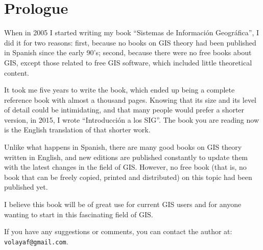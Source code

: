 \chapter*{Prologue}


When in 2005 I started writing my book ``Sistemas de Informaci\'{o}n Geogr\'{a}fica'', I did it for two reasons: first, because no books on GIS theory had been published in Spanish since the early 90's; second, because there were no free books about GIS, except those related to free GIS software, which included little theoretical content.

It took me five years to write the book, which ended up being a complete reference book with almost a thousand pages. Knowing that its size and its level of detail could be intimidating, and that many people would prefer a shorter version, in 2015, I wrote ``Introducci\'{o}n a los SIG''. The book you are reading now is the English translation of that shorter work.

Unlike what happens in Spanish, there are many good books on GIS theory written in English, and new editions are published constantly to update them with the latest changes in the field of GIS. However, no free book (that is, no book that can be freely copied, printed and distributed) on this topic had been published yet. 

I believe this book will be of great use for current GIS users and for anyone wanting to start in this fascinating field of GIS. 

If you have any suggestions or comments, you can contact the author at: \texttt{volayaf@gmail.com}.